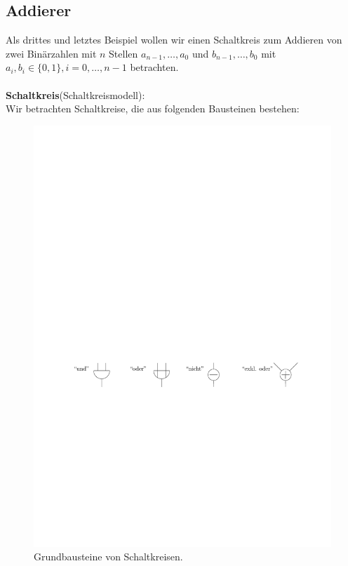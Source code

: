 \subsection{Addierer}
Als drittes und letztes Beispiel wollen wir einen 
Schaltkreis zum Addieren von zwei Binärzahlen mit $n$ Stellen $a_{n-1}, \dots, a_0$ und 
$b_{n-1}, \dots, b_0$ mit $a_i,b_i \in \{0,1\}, i=0, \dots, n-1$ betrachten.
\\\\{\bf{Schaltkreis}}(Schaltkreismodell):
\\Wir betrachten Schaltkreise, die aus folgenden Bausteinen bestehen:
\begin{figure}[h!]
\centering
\includegraphics[scale=0.8]{bilder/Bausteine.pdf}
\caption{Grundbausteine von Schaltkreisen.}
\end{figure}
\\\\

